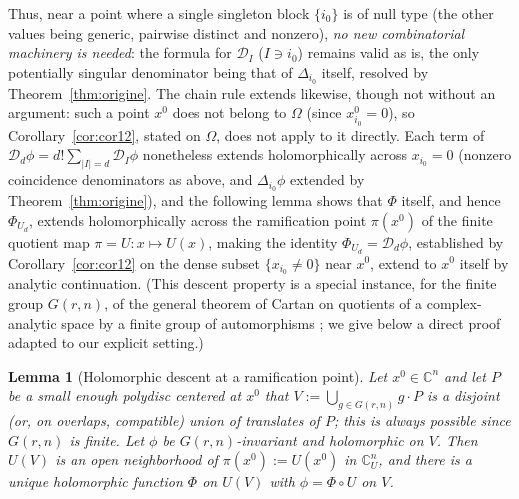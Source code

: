 \documentclass[10pt,a4paper]{amsart}
\newtheorem{lemma}[theorem]{Lemma}
\newcommand{\CC}{\mathbb{C}}
\begin{document}
Thus, near a point where a single singleton block $\{i_0\}$ is of null type (the other values being generic, pairwise distinct and nonzero), \emph{no new combinatorial machinery is needed}: the formula for $\mathcal D_I$ ($I\ni i_0$) remains valid as is, the only potentially singular denominator being that of $\Delta_{i_0}$ itself, resolved by Theorem~\ref{thm:origine}. The chain rule extends likewise, though not without an argument: such a point $x^0$ does not belong to $\Omega$ (since $x_{i_0}^0=0$), so Corollary~\ref{cor:cor12}, stated on $\Omega$, does not apply to it directly. Each term of $\mathcal D_d\phi=d!\sum_{|I|=d}\mathcal D_I\phi$ nonetheless extends holomorphically across $x_{i_0}=0$ (nonzero coincidence denominators as above, and $\Delta_{i_0}\phi$ extended by Theorem~\ref{thm:origine}), and the following lemma shows that $\Phi$ itself, and hence $\Phi_{U_d}$, extends holomorphically across the ramification point $\pi(x^0)$ of the finite quotient map $\pi=U:x\mapsto U(x)$, making the identity $\Phi_{U_d}=\mathcal D_d\phi$, established by Corollary~\ref{cor:cor12} on the dense subset $\{x_{i_0}\ne0\}$ near $x^0$, extend to $x^0$ itself by analytic continuation. (This descent property is a special instance, for the finite group $G(r,n)$, of the general theorem of Cartan on quotients of a complex-analytic space by a finite group of automorphisms \cite{Cartan}; we give below a direct proof adapted to our explicit setting.)

\begin{lemma}[Holomorphic descent at a ramification point]\label{lem:Phi-holo}
Let $x^0\in\CC^n$ and let $P$ be a small enough polydisc centered at $x^0$ that $V:=\bigcup_{g\in G(r,n)}g\cdot P$ is a disjoint (or, on overlaps, compatible) union of translates of $P$; this is always possible since $G(r,n)$ is finite. Let $\phi$ be $G(r,n)$-invariant and holomorphic on $V$. Then $U(V)$ is an open neighborhood of $\pi(x^0):=U(x^0)$ in $\CC^n_U$, and there is a unique holomorphic function $\Phi$ on $U(V)$ with $\phi=\Phi\circ U$ on $V$.
\end{lemma}
\end{document}
